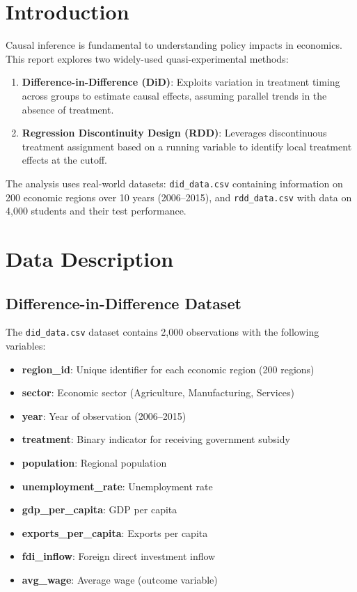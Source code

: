 \documentclass[a4paper,12pt,headsepline]{scrartcl} %
\begin{document}
\section{Introduction}
Causal inference is fundamental to understanding policy impacts in economics. This report explores two widely-used quasi-experimental methods:

\begin{enumerate}
    \item \textbf{Difference-in-Difference (DiD)}: Exploits variation in treatment timing across groups to estimate causal effects, assuming parallel trends in the absence of treatment.
    \item \textbf{Regression Discontinuity Design (RDD)}: Leverages discontinuous treatment assignment based on a running variable to identify local treatment effects at the cutoff.
\end{enumerate}

The analysis uses real-world datasets: \texttt{did\_data.csv} containing information on 200 economic regions over 10 years (2006--2015), and \texttt{rdd\_data.csv} with data on 4,000 students and their test performance.

\section{Data Description}

\subsection{Difference-in-Difference Dataset}
The \texttt{did\_data.csv} dataset contains 2,000 observations with the following variables:
\begin{itemize}
    \item \textbf{region\_id}: Unique identifier for each economic region (200 regions)
    \item \textbf{sector}: Economic sector (Agriculture, Manufacturing, Services)
    \item \textbf{year}: Year of observation (2006--2015)
    \item \textbf{treatment}: Binary indicator for receiving government subsidy
    \item \textbf{population}: Regional population
    \item \textbf{unemployment\_rate}: Unemployment rate
    \item \textbf{gdp\_per\_capita}: GDP per capita
    \item \textbf{exports\_per\_capita}: Exports per capita
    \item \textbf{fdi\_inflow}: Foreign direct investment inflow
    \item \textbf{avg\_wage}: Average wage (outcome variable)
\end{itemize}
\end{document}
